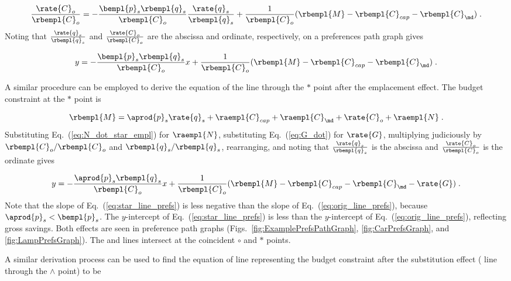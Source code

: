 \begin{equation}
  \frac{\rate{C}_o}{\rbempl{C}_o}
       = - \frac{\bempl{p}_s \rbempl{q}_s}{\rbempl{C}_o} \frac{\rate{q}_s}{\rbempl{q}_s}
         + \frac{1}{\rbempl{C}_o} (\rbempl{M} - \rbempl{C}_{cap} - \rbempl{C}_{\md}) \; .
\end{equation}
%
Noting that  
$\frac{\rate{q}_s}{\rbempl{q}_s}$ and 
$\frac{\rate{C}_o}{\rbempl{C}_o}$ are
the abscissa and ordinate, respectively,
on a preferences path graph gives

\begin{equation} \label{eq:orig_line_prefs}
  y = - \frac{\bempl{p}_s \rbempl{q}_s}{\rbempl{C}_o} x
         + \frac{1}{\rbempl{C}_o} (\rbempl{M} - \rbempl{C}_{cap} - \rbempl{C}_{\md}) \; .
\end{equation}

A similar procedure can be employed to derive the equation of the
\starstar{} line through the $*$ point
after the emplacement effect.
The budget constraint at the $*$ point is

\begin{equation}
  \rbempl{M} = \aprod{p}_s \rate{q}_s + \raempl{C}_{cap} + \raempl{C}_{\md} + \rate{C}_o + \raempl{N} \; .
\end{equation}
%
Substituting Eq.~(\ref{eq:N_dot_star_empl}) for $\raempl{N}$,
substituting Eq.~(\ref{eq:G_dot}) for $\rate{G}$,
multiplying judiciously by $\rbempl{C}_o/\rbempl{C}_o$ and $\rbempl{q}_s/\rbempl{q}_s$, 
rearranging, and noting that 
$\frac{\rate{q}_s}{\rbempl{q}_s}$ is the abscissa and 
$\frac{\rate{C}_o}{\rbempl{C}_o}$ is the ordinate gives

\begin{equation} \label{eq:star_line_prefs}
  y = - \frac{\aprod{p}_s \rbempl{q}_s}{\rbempl{C}_o} x
         + \frac{1}{\rbempl{C}_o} (\rbempl{M} - \rbempl{C}_{cap} - \rbempl{C}_{\md} - \rate{G}) \; .
\end{equation}
%
Note that the slope of Eq.~(\ref{eq:star_line_prefs}) is less negative
than the slope of Eq.~(\ref{eq:orig_line_prefs}), 
because $\aprod{p}_s < \bempl{p}_s$.
The $y$-intercept of Eq.~(\ref{eq:star_line_prefs}) is less than the 
$y$-intercept of Eq.~(\ref{eq:orig_line_prefs}),
reflecting gross savings.
Both effects are seen in
preference path graphs 
(Figs.~\ref{fig:ExamplePrefsPathGraph}, \ref{fig:CarPrefsGraph}, and \ref{fig:LampPrefsGraph}).
The \circcirc{} and \starstar{} lines intersect at the coincident $\circ$ and $*$ points.

A similar derivation process can be used to find the equation of 
line representing the budget constraint
after the substitution effect (\hathat{} line through the $\wedge$ point) to be

